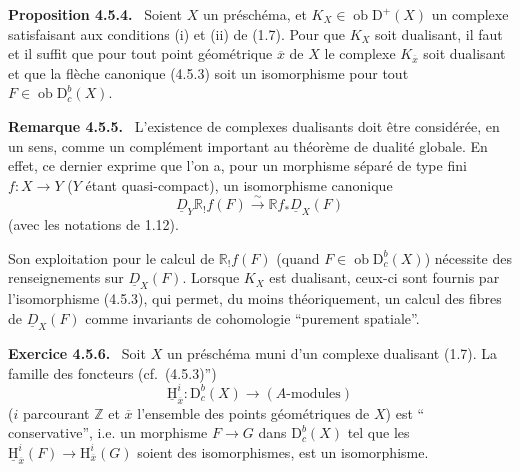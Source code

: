\documentclass[11pt]{article}
\providecommand{\uH}{\underline{\mathrm H}}
\newenvironment{statement}[1]{\par\medskip\noindent\textbf{#1.}\ }{\par\medskip}
\renewcommand{\H}{\mathrm{H}}
\newcommand{\R}{\mathbb{R}}\newcommand{\RHomCore}{\mathbb{R}\mathrm{Hom}}
\newcommand{\D}{\mathrm{D}}
\newcommand{\Z}{\mathbb{Z}}
\newcommand{\ob}{\operatorname{ob}}
\newcommand{\ol}[1]{\overline{#1}}
\providecommand{\ob}{\operatorname{ob}}
\providecommand{\R}{\mathrm R}
\providecommand{\Z}{\mathbb Z}
\begin{document}
\begin{statement}{Proposition 4.5.4}
Soient $X$ un préschéma, et $K_X\in\ob\D^+(X)$ un complexe satisfaisant aux conditions (i) et (ii) de (1.7). Pour que $K_X$ soit dualisant, il faut et il suffit que pour tout point géométrique $\ol{x}$ de $X$ le complexe $K_{\ol{x}}$ soit dualisant et que la flèche canonique (4.5.3) soit un isomorphisme pour tout $F\in\ob\D_c^b(X)$.
\end{statement}

\begin{statement}{Remarque 4.5.5}
L'existence de complexes dualisants doit être considérée, en un sens, comme un complément important au théorème de dualité globale. En effet, ce dernier exprime que l'on a, pour un morphisme séparé de type fini $f:X\to Y$ ($Y$ étant quasi-compact), un isomorphisme canonique
\[
\underline{D}_Y\R_!f(F)\xrightarrow{\sim}\R f_*\underline{D}_X(F)
\]
(avec les notations de 1.12).

Son exploitation pour le calcul de $\R_!f(F)$ (quand $F\in\ob\D_c^b(X)$) nécessite des renseignements sur $\underline{D}_X(F)$. Lorsque $K_X$ est dualisant, ceux-ci sont fournis par l'isomorphisme (4.5.3), qui permet, du moins théoriquement, un calcul des fibres de $\underline{D}_X(F)$ comme invariants de cohomologie ``purement spatiale''.
\end{statement}

\begin{statement}{Exercice 4.5.6}
Soit $X$ un préschéma muni d'un complexe dualisant (1.7). La famille des foncteurs (cf.~(4.5.3)'')
\[
\underline{\H}_{\ol{x}}^i:\D_c^b(X)\longrightarrow (A\text{-modules})
\]
($i$ parcourant $\Z$ et $\ol{x}$ l'ensemble des points géométriques de $X$) est 
``%
conservative'', i.e. un morphisme $F\to G$ dans $\D_c^b(X)$ tel que les $\uH_{\ol{x}}^i(F)\to\H_{\ol{x}}^i(G)$ soient des isomorphismes, est un isomorphisme.
\end{statement}
\end{document}
